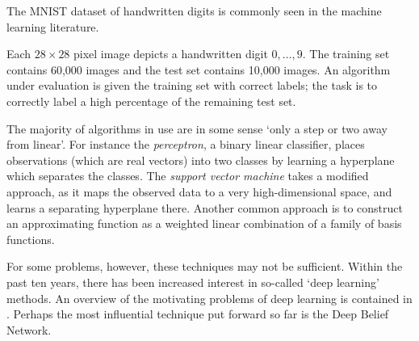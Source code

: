 \documentclass[11pt,titlepage]{article}
\numberwithin{equation}{section}
\begin{document}
    \begin{example} 
    The MNIST dataset of handwritten digits \cite{MNIST} is commonly seen in the
    machine learning literature.
    \begin{center}
    \end{center}
    Each $28\times28$ pixel image depicts a handwritten digit $0, \ldots, 9$.
    The training set contains 60,000 images and the test set contains 10,000
    images.  An algorithm under evaluation is given the training set with
    correct labels; the task is to correctly label a high percentage of the
    remaining test set.
    \end{example}

    The majority of algorithms in use are in some sense `only a step or two away
    from linear'.  For instance the \emph{perceptron}, a binary linear
    classifier, places observations (which are real vectors) into two classes by
    learning a hyperplane which separates the classes.  The \emph{support vector
    machine} takes a modified approach, as it maps the observed data to a very
    high-dimensional space, and learns a separating hyperplane there.  Another
    common approach is to construct an approximating function as a weighted
    linear combination of a family of basis functions.

    For some problems, however, these techniques may not be sufficient.  Within
    the past ten years, there has been increased interest in so-called `deep
    learning' methods.  An overview of the motivating problems of deep learning
    is contained in \cite{Ben09}.  Perhaps the most influential technique put
    forward so far is the Deep Belief Network.
\end{document}

